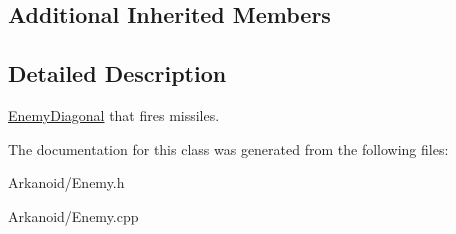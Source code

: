 \subsection*{Additional Inherited Members}


\subsection{Detailed Description}
\hyperlink{class_enemy_diagonal}{Enemy\+Diagonal} that fires missiles. 

The documentation for this class was generated from the following files\+:\begin{DoxyCompactItemize}
\item 
Arkanoid/Enemy.\+h\item 
Arkanoid/Enemy.\+cpp\end{DoxyCompactItemize}

